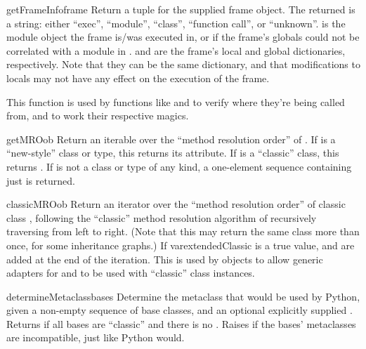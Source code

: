 \begin{verbatim%
}
\begin{verbatim%
}
\begin{verbatim%
}
\begin{verbatim%
}
\begin{verbatim%
}
\begin{verbatim%
}
\begin{funcdesc}{getFrameInfo}{frame}
Return a  tuple for
the supplied frame object.  The returned  is a string: either
``exec'', ``module'', ``class'', ``function call'', or ``unknown''.
 is the module object the frame is/was executed in, or
 if the frame's globals could not be correlated with a module in
.   and  are the frame's local
and global dictionaries, respectively.  Note that they can be the same
dictionary, and that modifications to locals may not have any effect on the
execution of the frame.

This function is used by functions like  and
 to verify where they're being called from, and to work
their respective magics.
\end{funcdesc}


\begin{funcdesc}{getMRO}{ob }
Return an iterable over the ``method resolution order'' of .  If
 is a ``new-style'' class or type, this returns its 
attribute.  If  is a ``classic'' class, this returns
.  If  is not a class
or type of any kind, a one-element sequence containing just  is
returned.
\end{funcdesc}


\begin{funcdesc}{classicMRO}{ob }
Return an iterator over the ``method resolution order'' of classic class
, following the ``classic'' method resolution algorithm of recursively
traversing  from left to right.  (Note that this may return
the same class more than once, for some inheritance graphs.)  If
var{extendedClassic} is a true value,  and 
are added at the end of the iteration.  This is used by 
objects to allow generic adapters for  and 
to be used with ``classic'' class instances.
\end{funcdesc}




\begin{funcdesc}{determineMetaclass}{bases }
Determine the metaclass that would be used by Python, given a non-empty
sequence of base classes, and an optional explicitly supplied
.  Returns  if all bases are ``classic''
and there is no .  Raises  if the bases'
metaclasses are incompatible, just like Python would.
\end{funcdesc}



\end{verbatim%
}
\end{verbatim%
}
\end{verbatim%
}
\end{verbatim%
}
\end{verbatim%
}
\end{verbatim%
}

